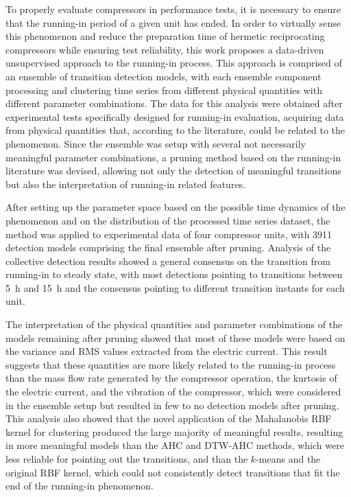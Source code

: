 \documentclass[preprint,11pt,number]{elsarticle}
\begin{document}
To properly evaluate compressors in performance tests, it is necessary to ensure that the running-in period of a given unit has ended. In order to virtually sense this phenomenon and reduce the preparation time of hermetic reciprocating compressors while ensuring test reliability, this work proposes a data-driven unsupervised approach to the running-in process. This approach is comprised of an ensemble of transition detection models, with each ensemble component processing and clustering time series from different physical quantities with different parameter combinations. The data for this analysis were obtained after experimental tests specifically designed for running-in evaluation, acquiring data from physical quantities that, according to the literature, could be related to the phenomenon. Since the ensemble was setup with several not necessarily meaningful parameter combinations, a pruning method based on the running-in literature was devised, allowing not only the detection of meaningful transitions but also the interpretation of running-in related features.

After setting up the parameter space based on the possible time dynamics of the phenomenon and on the distribution of the processed time series dataset, the method was applied to experimental data of four compressor units, with \num{3911} detection models comprising the final ensemble after pruning. Analysis of the collective detection results showed a general consensus on the transition from running-in to steady state, with most detections pointing to transitions between \SI{5}{\hour} and \SI{15}{\hour} and the consensus pointing to different transition instants for each unit.

The interpretation of the physical quantities and parameter combinations of the models remaining after pruning showed that most of these models were based on the variance and RMS values extracted from the electric current. This result suggests that these quantities are more likely related to the running-in process than the mass flow rate generated by the compressor operation, the kurtosis of the electric current, and the vibration of the compressor, which were considered in the ensemble setup but resulted in few to no detection models after pruning. This analysis also showed that the novel application of the Mahalanobis RBF kernel for clustering produced the large majority of meaningful results, resulting in more meaningful models than the AHC and DTW-AHC methods, which were less reliable for pointing out the transitions, and than the $k$-means and the original RBF kernel, which could not consistently detect transitions that fit the end of the running-in phenomenon.
\end{document}
